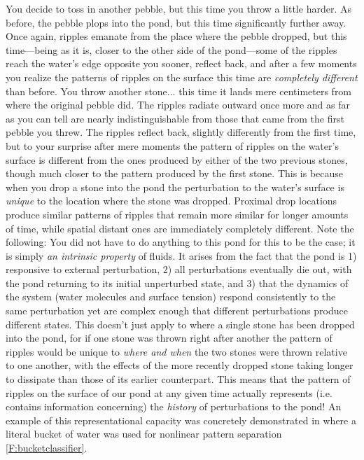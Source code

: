 You decide to toss in another pebble, but this time you throw a little harder. As before, the pebble plops into the pond, but this time significantly further away. Once again, ripples emanate from the place where the pebble dropped, but this time---being as it is, closer to the other side of the pond---some of the ripples reach the water's edge opposite you sooner, reflect back, and after a few moments you realize the patterns of ripples on the surface this time are \emph{completely different} than before. You throw another stone... this time it lands mere centimeters from where the original pebble did. The ripples radiate outward once more and as far as you can tell are nearly indistinguishable from those that came from the first pebble you threw. The ripples reflect back, slightly differently from the first time, but to your surprise after mere moments the pattern of ripples on the water's surface is different from the ones produced by either of the two previous stones, though much closer to the pattern produced by the first stone. This is because when you drop a stone into the pond the perturbation to the water's surface is \emph{unique} to the location where the stone was dropped. Proximal drop locations produce similar patterns of ripples that remain more similar for longer amounts of time, while spatial distant ones are immediately completely different. Note the following: You did not have to do anything to this pond for this to be the case; it is simply \emph{an intrinsic property} of fluids. It arises from the fact that the pond is 1) responsive to external perturbation, 2) all perturbations eventually die out, with the pond returning to its initial unperturbed state, and 3) that the dynamics of the system (water molecules and surface tension) respond consistently to the same perturbation yet are complex enough that different perturbations produce different states. This doesn't just apply to where a single stone has been dropped into the pond, for if one stone was thrown right after another the pattern of ripples would be unique to \emph{where and when} the two stones were thrown relative to one another, with the effects of the more recently dropped stone taking longer to dissipate than those of its earlier counterpart. This means that the pattern of ripples on the surface of our pond at any given time actually represents (i.e. contains information concerning) the \emph{history} of perturbations to the pond! An example of this representational capacity was concretely demonstrated in \cite{fernando2003pattern} where a literal bucket of water was used for nonlinear pattern separation \ref{F:bucketclassifier}.

